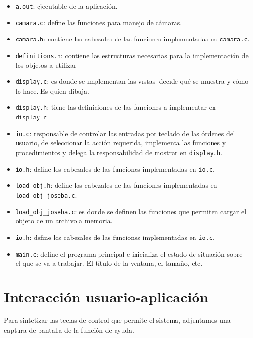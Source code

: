 \documentclass[12pt,a4paper]{article}
\begin{document}
\begin{itemize}
  \item \texttt{a.out}: ejecutable de la aplicación.
  \item \texttt{camara.c}: define las funciones para manejo de cámaras.
  \item \texttt{camara.h}: contiene los cabezales de las funciones implementadas en \texttt{camara.c}.
  \item \texttt{definitions.h}: contiene las estructuras necesarias para la implementación de los objetos a utilizar
  \item \texttt{display.c}: es donde se implementan las vistas, decide qué se muestra y cómo lo hace. Es quien dibuja.
  \item \texttt{display.h}: tiene las definiciones de las funciones a implementar en \texttt{display.c}.
  \item \texttt{io.c}: responsable de controlar las entradas por teclado de las órdenes del usuario, de seleccionar la acción requerida, implementa las funciones y procedimientos y delega la responsabilidad de mostrar en \texttt{display.h}.
  \item \texttt{io.h}: define los cabezales de las funciones implementadas en \texttt{io.c}.
  \item \texttt{load\_obj.h}: define los cabezales de las funciones implementadas en \texttt{load\_obj\_joseba.c}.
  \item \texttt{load\_obj\_joseba.c}: es donde se definen las funciones que permiten cargar el objeto de un archivo a memoria.
  \item \texttt{io.h}: define los cabezales de las funciones implementadas en \texttt{io.c}.
  \item \texttt{main.c}: define el programa principal e inicializa el estado de situación sobre el que se va a trabajar. El título de la ventana,  el tamaño, etc.
\end{itemize}













\newpage

\section{Interacción usuario-aplicación}
Para sintetizar las teclas de control que permite el sistema, adjuntamos una captura de pantalla de la función de ayuda.
\end{document}
